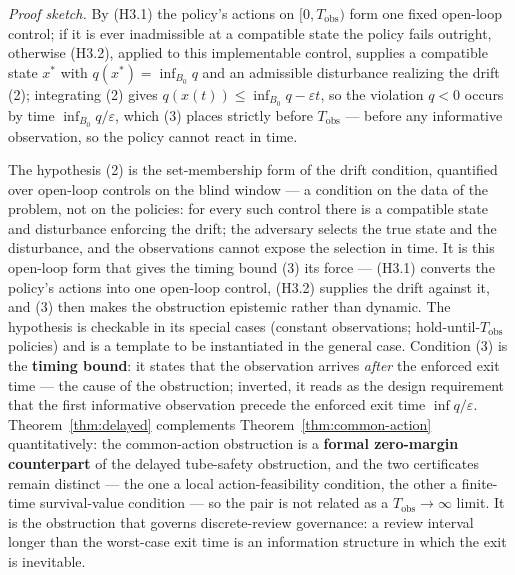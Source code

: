 \documentclass[10pt,twocolumn]{article}
\theoremstyle{definition}
\begin{document}
\emph{Proof sketch.} By (H3.1) the policy's actions on \([0, T_{\mathrm{obs}})\) form one fixed open-loop control; if it is ever inadmissible at a compatible state the policy fails outright, otherwise (H3.2), applied to this implementable control, supplies a compatible state \(x^*\) with \(q(x^*) = \inf_{B_0} q\) and an admissible disturbance realizing the drift (2); integrating (2) gives \(q(x(t)) \le \inf_{B_0} q - \varepsilon t\), so the violation \(q < 0\) occurs by time \(\inf_{B_0} q / \varepsilon\), which (3) places strictly before \(T_{\mathrm{obs}}\) --- before any informative observation, so the policy cannot react in time.

The hypothesis (2) is the set-membership form of the drift condition,
quantified over open-loop controls on the blind window --- a condition
on the data of the problem, not on the policies: for every such control
there is a compatible state and disturbance enforcing the drift; the
adversary selects the true state and the disturbance, and the
observations cannot expose the selection in time. It is this open-loop form that gives the timing bound (3) its force --- (H3.1) converts
the policy's actions into one open-loop control, (H3.2) supplies the
drift against it, and (3) then makes the obstruction epistemic rather
than dynamic. The hypothesis is checkable in its special cases (constant
observations; hold-until-\(T_{\mathrm{obs}}\) policies) and is a template to be instantiated in the general case. Condition (3) is
the \textbf{timing bound}: it states that the observation arrives
\emph{after} the enforced exit time --- the cause of the obstruction; inverted, it reads as the design requirement that the first informative observation precede the enforced exit time
\(\inf q / \varepsilon\). Theorem~\ref{thm:delayed} complements Theorem~\ref{thm:common-action} quantitatively:
the common-action obstruction is a \textbf{formal zero-margin counterpart}
of the delayed tube-safety obstruction, and the two certificates remain
distinct --- the one a local action-feasibility condition, the other a
finite-time survival-value condition --- so the pair is not related as a
\(T_{\mathrm{obs}} \to \infty\) limit. It is the obstruction that
governs discrete-review governance: a review interval longer than the
worst-case exit time is an information structure in which the exit is inevitable.
\end{document}
